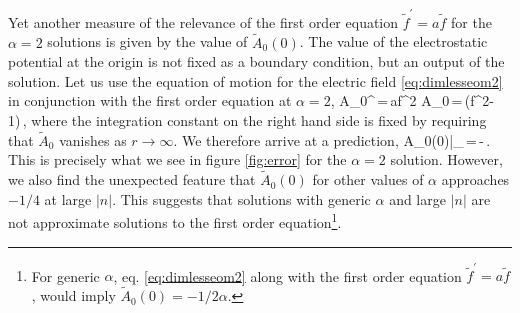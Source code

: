 Yet another measure of the relevance of the first order equation $\tilde f^\prime = a \tilde f$ for the $\alpha=2$ solutions is given by the value of $\tilde A_0(0)$. The value of the electrostatic potential at the origin is not fixed as a boundary condition, but an output of the solution. Let us use the equation of motion for the electric field \eqref{eq:dimlesseom2} in conjunction with the first order equation at $\alpha=2$,
\be
\tilde A_0^\prime\,=\,a\tilde f^2 \quad{}  \quad 
\tilde A_0\,=\,\left(\tilde f^2-1\right)\,,
\ee
where the integration constant on the right hand side is fixed by requiring that $\tilde A_0$ vanishes as $r\to\infty$. 
We therefore arrive at a prediction,
\be
\tilde A_0(0)\big|_{}\,=\,-\,.
\ee
This is precisely what we see in figure \ref{fig:error} for the $\alpha=2$ solution. However, we also find the unexpected feature that $\tilde A_0(0)$ for other values of $\alpha$ approaches $-1/4$ at large $|n|$. This suggests  that solutions with generic $\alpha$ and large $|n|$ are not approximate  solutions to the first order equation\footnote{For generic $\alpha$, eq. \eqref{eq:dimlesseom2} along with the first order equation $\tilde f^\prime = a \tilde f$, would imply $\tilde A_0(0)=-1/2\alpha$. }.
